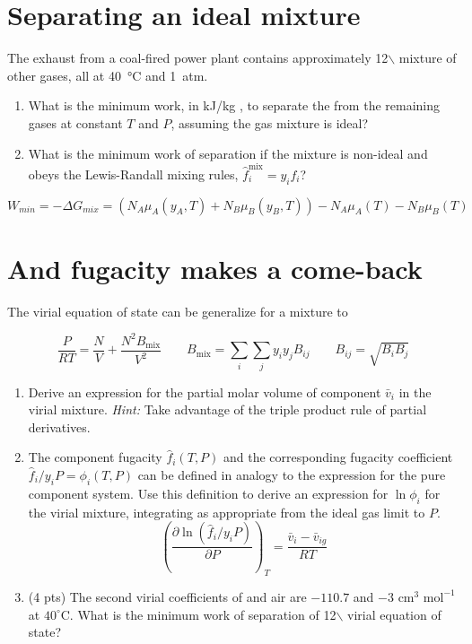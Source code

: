 \documentclass[11pt]{article}
\begin{document}
\section{Separating an ideal mixture}
\label{sec:org4f01927}
The exhaust from a coal-fired power plant contains approximately 12$\backslash$%
  mixture of other gases, all at \SI{40}{\celsius} and \SI{1}{atm}.

\begin{enumerate}
\item What is the minimum work, in kJ/kg , to separate the  from the
remaining gases at constant \(T\) and \(P\), assuming the gas mixture is ideal?

\item What is the minimum work of separation if the mixture is non-ideal and obeys the
Lewis-Randall mixing rules, \(\hat{f}_i^{\text{mix}} = y_i f_i\)?
\end{enumerate}

\[
W_{min} = -\Delta G_{mix} = (N_A \mu_A(y_A,T) + N_B \mu_B(y_B,T)) - N_A \mu_A(T) - N_B \mu_B(T)
\]

\section{And fugacity makes a come-back}
\label{sec:org3825df8}
The virial equation of state can be generalize for a mixture to

\begin{equation*}
  \frac{P}{RT} = \frac{N}{V} + \frac{N^2 B_\text{mix}}{V^2} \qquad B_\text{mix} =
  \sum_i\sum_j y_iy_j B_{ij} \qquad B_{ij} = \sqrt{B_iB_j}
\end{equation*}

\begin{enumerate}
\item Derive an expression for the partial molar volume of component \(\bar v_{i}\) in the virial
mixture.  \textit{Hint:} Take advantage of the triple product rule of partial derivatives.

\item The component fugacity \(\hat{f}_{i}(T,P)\) and the corresponding fugacity coefficient \(\hat{f}_i/y_i
   P = \phi_i(T,P)\) can be defined in analogy to the expression for the pure component system.
Use this definition to derive an expression for \(\ln \phi_i\) for the virial
mixture, integrating as appropriate from the ideal gas limit to \(P\).
\begin{equation}
  \left ( \frac{\partial\ln\left(\hat{f}_{i}/y_{i}P\right)}{\partial P} \right )_{T} = \frac{\bar{v}_{i} - \bar{v}_{ig}}{RT}
\end{equation}

\item (4 pts) The second virial coefficients of  and air are \(-110.7\) and
\(-3 \text{ cm}^3 \text{ mol}^{-1}\) at \(40^\circ\)C. What is the minimum work of
separation of 12$\backslash$%
virial equation of state?
\end{enumerate}
\end{document}
